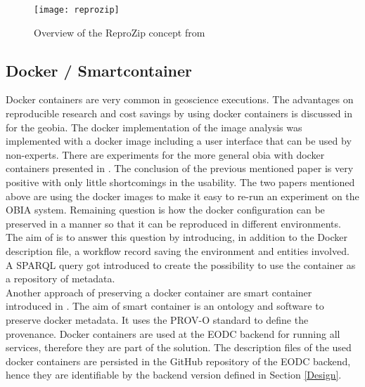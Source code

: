 \documentclass[draft,final]{vutinfth} %
\begin{document}
\begin{figure}[h]
	\centering
	\texttt{[image: reprozip]}
	\caption{Overview of the ReproZip concept from \cite{29c5846926a4497d95f276604cb0368c} }
	\label{fig:reprozip} %
\end{figure}

\subsection{Docker / Smartcontainer}\label{Smartcontainer}
Docker containers are very common in geoscience executions. The advantages on reproducible research and cost savings by using docker containers is discussed in \cite{rs9030290} for the \gls{geobia}. The docker implementation of the image analysis was implemented with a docker image including a user interface that can be used by non-experts. There are experiments for the more general \gls{obia} with docker containers presented in \cite{proceedings456}. The conclusion of the previous mentioned paper is very positive with only little shortcomings in the usability. The two papers mentioned above are using the docker images to make it easy to re-run an experiment on the OBIA system. Remaining question is how the docker configuration can be preserved in a manner so that it can be reproduced in different environments. The aim of \cite{emsley2017a} is to answer this question by introducing, in addition to the Docker description file, a workflow record saving the environment and entities involved. A SPARQL query got introduced to create the possibility to use the container as a repository of metadata.\\ 
Another approach of preserving a docker container are smart container introduced in \cite{Huo2015SmartCA}. The aim of smart container is an ontology and software to preserve docker metadata. It uses the PROV-O standard to define the provenance. 
Docker containers are used at the EODC backend for running all services, therefore they are part of the solution. The description files of the used docker containers are persisted in the GitHub repository of the EODC backend, hence they are identifiable by the backend version defined in Section \ref{Design}.   
\end{document}
